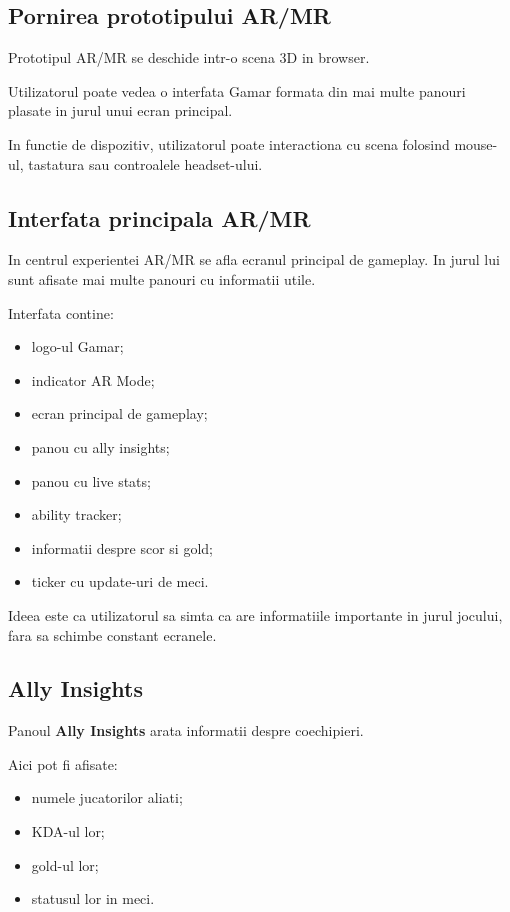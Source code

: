 \documentclass[12pt,a4paper]{article}
\begin{document}
\subsection{Pornirea prototipului AR/MR}

Prototipul AR/MR se deschide intr-o scena 3D in browser.

Utilizatorul poate vedea o interfata Gamar formata din mai multe panouri plasate in jurul unui ecran principal.

In functie de dispozitiv, utilizatorul poate interactiona cu scena folosind mouse-ul, tastatura sau controalele headset-ului.

\subsection{Interfata principala AR/MR}

In centrul experientei AR/MR se afla ecranul principal de gameplay. In jurul lui sunt afisate mai multe panouri cu informatii utile.

Interfata contine:

\begin{itemize}
    \item logo-ul Gamar;
    \item indicator AR Mode;
    \item ecran principal de gameplay;
    \item panou cu ally insights;
    \item panou cu live stats;
    \item ability tracker;
    \item informatii despre scor si gold;
    \item ticker cu update-uri de meci.
\end{itemize}

Ideea este ca utilizatorul sa simta ca are informatiile importante in jurul jocului, fara sa schimbe constant ecranele.

\subsection{Ally Insights}

Panoul \textbf{Ally Insights} arata informatii despre coechipieri.

Aici pot fi afisate:

\begin{itemize}
    \item numele jucatorilor aliati;
    \item KDA-ul lor;
    \item gold-ul lor;
    \item statusul lor in meci.
\end{itemize}
\end{document}
